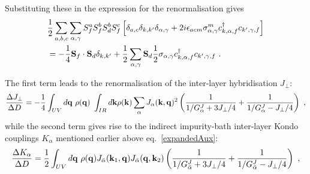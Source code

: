 Substituting these in the expression for the renormalisation gives
\begin{equation}\begin{aligned}
	&\frac{1}{2}\sum_{a,b,c} \sum_{\alpha,\gamma} S_f^a S_f^b S_d^b S_f^c \left[\delta_{a,c}\delta_{k,k^\prime}\delta_{\alpha,\gamma} + 2i \epsilon_{acm} \sigma^m_{\alpha,\gamma}c^\dagger_{k,\alpha,f} c_{k^\prime,\gamma,f}\right]\\
	&= -\frac{1}{4}{\bf S}_f \cdot {\bf S}_d \delta_{k,k^\prime} + \frac{1}{2} \sum_{\alpha,\gamma} {\bf S}_d \frac{1}{2}{\bf \sigma}_{\alpha,\gamma}c^\dagger_{k,\alpha,f} c_{k^\prime,\gamma,f}~.
\end{aligned}\end{equation}

The first term leads to the renormalisation of the inter-layer hybridisation \(J_\perp\):
\begin{equation}\begin{aligned}\label{perpRenormalisation}
	\frac{\Delta J_\perp}{\Delta D} = -\frac{1}{4}\int_{UV} d{\bf q} ~\rho({\bf q})~\int_{IR} d{\bf k} \rho({\bf k}) \sum_\alpha J_\alpha({\bf k}, {\bf q})^2\left(\frac{1}{1/G_\alpha^J + 3J_\perp/4} + \frac{1}{1/G_\alpha^J - J_\perp/4}\right)~,
\end{aligned}\end{equation}
while the second term gives rise to the indirect impurity-bath inter-layer Kondo couplings \(K_\alpha\) mentioned earlier above eq.~\ref{expandedAux}:
\begin{equation}\begin{aligned}\label{indirectRenormalisation}
	\frac{\Delta K_\alpha}{\Delta D} = \frac{1}{2}\int_{UV} d{\bf q} ~\rho({\bf q}) J_{\bar\alpha}({\bf k}_1, {\bf q})J_{\bar\alpha}({\bf q}, {\bf k}_2) \left(\frac{1}{1/G_{\bar\alpha}^J + 3J_\perp/4} + \frac{1}{1/G_{\bar\alpha}^J - J_\perp/4}\right)~,
\end{aligned}\end{equation}


